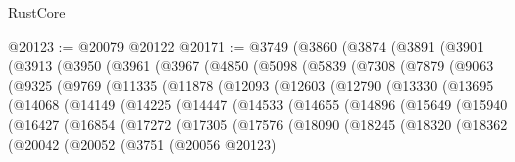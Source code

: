 \begin{lexlean}{RustCore}
\begin{coremodule}
@20123 := @20079 @20122
@20171 := @3749
    (@3860
      (@3874
        (@3891
          (@3901
            (@3913
              (@3950
                (@3961
                  (@3967
                    (@4850
                      (@5098
                        (@5839
                          (@7308
                            (@7879
                              (@9063
                                (@9325
                                  (@9769
                                    (@11335
                                      (@11878
                                        (@12093
                                          (@12603
                                            (@12790
                                              (@13330
                                                (@13695
                                                  (@14068
                                                    (@14149
                                                      (@14225
                                                        (@14447
                                                          (@14533
                                                            (@14655
                                                              (@14896
                                                                (@15649
                                                                  (@15940
                                                                    (@16427
                                                                      (@16854
                                                                        (@17272
                                                                          (@17305
                                                                            (@17576
                                                                              (@18090
                                                                                (@18245
                                                                                  (@18320
                                                                                    (@18362
                                                                                      (@20042
                                                                                        (@20052
                                                                                          (@3751
                                                                                            (@20056
                                                                                              @20123)

\end{coremodule}
\end{lexlean}
